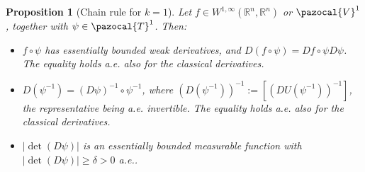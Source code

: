 \documentclass[english,a4paper,10pt,oneside]{scrbook}	%
\theoremstyle{break}
\newtheorem{prop}[equation]{Proposition}
\theoremstyle{remark}
\newcommand{\mR}{\mathbb{R}}
\newcommand{\cV}{\pazocal{V}}
\newcommand{\cT}{\pazocal{T}}
\begin{document}
\begin{prop}[Chain rule for $k=1$]
\label{prop:chain}
Let $f \in W^{1,\infty}(\mR^n,\mR^n)$ or $\cV^1$, together with $\psi \in \cT^1$.  Then:

\begin{itemize}

\item $f \circ \psi$ has essentially bounded weak derivatives, and $D(f \circ \psi) = Df \circ \psi D\psi$. The equality holds a.e. also for the classical derivatives.

\item  $D(\psi^{-1}) = (D\psi)^{-1} \circ \psi^{-1}$, where $(D(\psi^{-1}))^{-1}:=[(DU(\psi^{-1}))^{-1}]$, the representative being a.e. invertible. The equality holds a.e. also for the classical derivatives.

\item $|\det(D\psi)|$ is an essentially bounded measurable function with $|\det(D\psi)|\geq \delta>0$ a.e.. 
\end{itemize} 

\end{prop}
\end{document}
